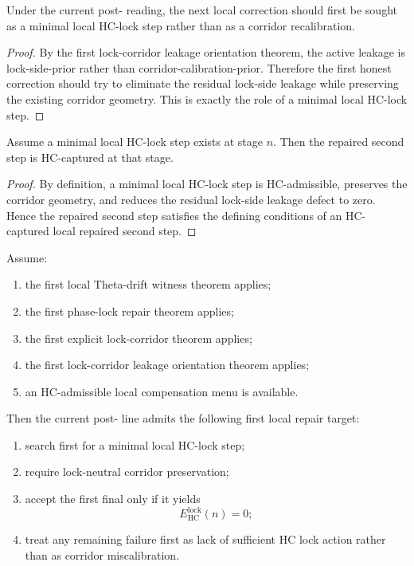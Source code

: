 \begin{proposition}
\label{prop:the-current-line-calls-first-for-a-minimal-hc-lock-step}
Under the current post- reading, the next local correction should first be sought as a minimal local HC-lock step rather than as a corridor recalibration.
\end{proposition}

\begin{proof}
By the first lock-corridor leakage orientation theorem, the active leakage is lock-side-prior rather than corridor-calibration-prior. Therefore the first honest correction should try to eliminate the residual lock-side leakage while preserving the existing corridor geometry. This is exactly the role of a minimal local HC-lock step.
\end{proof}

\begin{lemma}
\label{lem:minimal-hc-lock-step-implies-hc-capture}
Assume a minimal local HC-lock step exists at stage $n$. Then the repaired second step is HC-captured at that stage.
\end{lemma}

\begin{proof}
By definition, a minimal local HC-lock step is HC-admissible, preserves the corridor geometry, and reduces the residual lock-side leakage defect to zero. Hence the repaired second step satisfies the defining conditions of an HC-captured local repaired second step.
\end{proof}

\begin{theorem}
\label{thm:first-minimal-hc-lock-step-theorem}
Assume:
\begin{enumerate}[leftmargin=2em,label=(\alph*)]
 \item the first local Theta-drift witness theorem applies;
 \item the first phase-lock repair theorem applies;
 \item the first explicit lock-corridor theorem applies;
 \item the first lock-corridor leakage orientation theorem applies;
 \item an HC-admissible local compensation menu is available.
\end{enumerate}
Then the current post- line admits the following first local repair target:
\begin{enumerate}[leftmargin=2em,label=(\roman*)]
 \item search first for a minimal local HC-lock step;
 \item require lock-neutral corridor preservation;
 \item accept the first final only if it yields
 \[
 E_{\mathrm{HC}}^{\mathrm{lock}}(n)=0;
 \]
 \item treat any remaining failure first as lack of sufficient HC lock action rather than as corridor miscalibration.
\end{enumerate}
\end{theorem}

